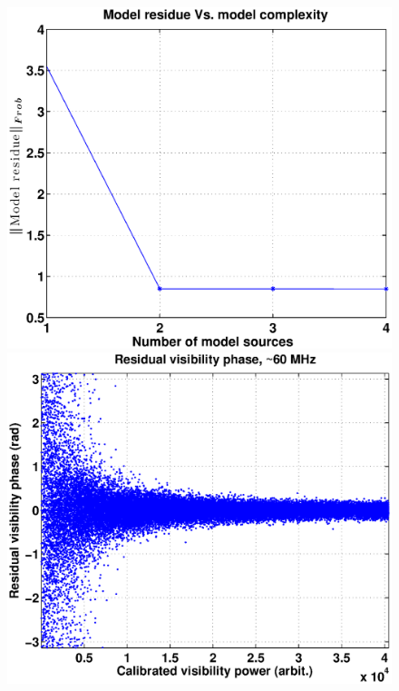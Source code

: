 \documentclass[referee]{aa}
\begin{document}
\begin{figure}[tbh]
\subfloat
  {\includegraphics[width=1\columnwidth]{Figs/model_efficacy.eps}}
\subfloat
  {\includegraphics[width=1\columnwidth]{Figs/selfcal_ph_behaviour_new.eps}}


\end{figure}
\end{document}
